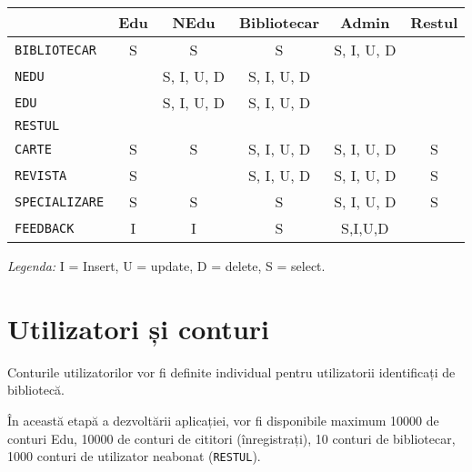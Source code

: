 \begin{center}
  \small
  \begin{tabular}{|l|c|c|c|c|c|}
    \hline
    & Edu & NEdu & Bibliotecar & Admin & Restul \\
    \hline\hline
    \texttt{BIBLIOTECAR} & S & S & S & S, I, U, D & \\
    \hline
    \texttt{NEDU} & & S, I, U, D & S, I, U, D & & \\
    \hline
    \texttt{EDU} & & S, I, U, D & S, I, U, D & & \\
    \hline
    \texttt{RESTUL} & & & & & \\
    \hline
    \texttt{CARTE} & S & S & S, I, U, D & S, I, U, D & S \\
    \hline
    \texttt{REVISTA} & S & & S, I, U, D & S, I, U, D & S \\
    \hline
    \texttt{SPECIALIZARE} & S & S & S & S, I, U, D & S \\
    \hline
    \texttt{FEEDBACK} & I & I & S & S,I,U,D & \\
    \hline
  \end{tabular}
\end{center}

\emph{Legenda:} I = Insert, U = update, D = delete, S = select.


\section{Utilizatori și conturi}
\label{sec:ut-cont}

Conturile utilizatorilor vor fi definite individual pentru utilizatorii
identificați de bibliotecă.

În această etapă a dezvoltării aplicației, vor fi disponibile maximum
10000 de conturi Edu, 10000 de conturi de cititori (înregistrați),
10 conturi de bibliotecar, 1000 conturi de utilizator neabonat
(\texttt{RESTUL}).


